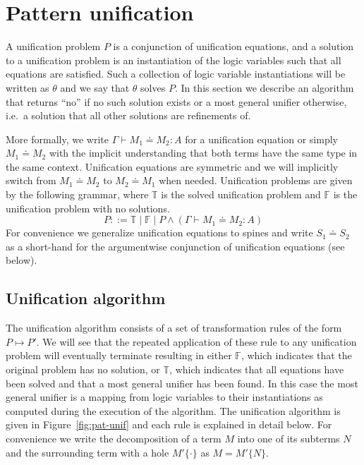 \documentclass{eptcs}
\theoremstyle{definition}
\begin{document}
\section{Pattern unification}
A unification problem $P$ is a conjunction of unification
equations, and a solution to a unification problem is an instantiation
of the logic variables such that all equations are satisfied.  Such a
collection of logic variable instantiations will be written as $\theta$
and we say that $\theta$ solves $P$.  In this section we describe an
algorithm that returns ``no'' if no such solution exists or a
most general unifier otherwise, i.e.\ a solution that all other solutions are
refinements of.


More formally, we write $\Gamma\vdash M_1\doteq M_2 :A$ for a unification equation 
or simply $M_1\doteq M_2$ with the implicit understanding that both
terms have the same type in the same context.
Unification equations are symmetric and we will implicitly
switch from $M_1\doteq M_2$ to $M_2\doteq M_1$ when needed.  Unification
problems are given by the following grammar, where $\mathbb{T}$ is the
solved unification problem and $\mathbb{F}$ is the unification problem
with no solutions.
\[
P::= \mathbb{T} \mid \mathbb{F} \mid P\land (\Gamma\vdash M_1\doteq M_2 :A)
\]
For convenience we generalize unification equations to spines
and write $S_1 \doteq S_2 $ as a
short-hand for the argumentwise conjunction of unification equations
(see below).


\subsection{Unification algorithm}\label{sec:unification}
The unification algorithm consists of a set of
transformation rules of the form $P\mapsto P'$.   We will see 
that the repeated application of these rule to any unification problem 
will eventually terminate resulting in  either $\mathbb{F}$, which indicates that the original problem has
no solution, or $\mathbb{T}$, which indicates that all equations have been
solved and that a most general unifier has been found.  In this case the
most general unifier is a mapping from logic variables to their
instantiations as computed during the execution of the
algorithm.  The unification algorithm is given in
Figure~\ref{fig:pat-unif} and each rule is explained in detail below.
For convenience we write the decomposition of a term $M$ into one of
its subterms $N$ and the surrounding term with a hole $M'\{\cdot\}$ as $M=M'\{N\}$.
\end{document}
